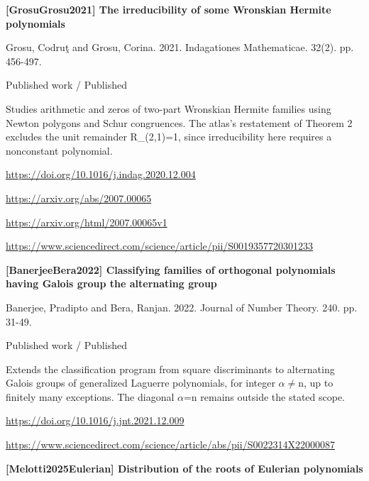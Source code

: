 \documentclass[11pt,a4paper,oneside,openany]{book}
\begin{document}
\vspace{9pt}
\hypertarget{ref:GrosuGrosu2021}{}
{\sffamily\bfseries\color{atlasgreen}[GrosuGrosu2021] The irreducibility of some Wronskian Hermite polynomials}\par
\color{black} Grosu, Codruţ and Grosu, Corina. 2021. Indagationes Mathematicae. 32(2). pp. 456-497.\par
{\small\sffamily\color{atlasgold}Published work / Published}\par
\color{black} Studies arithmetic and zeros of two-part Wronskian Hermite families using Newton polygons and Schur congruences. The atlas's restatement of Theorem 2 excludes the unit remainder R\_\allowbreak{}(2,1)=1, since irreducibility here requires a nonconstant polynomial.\par
{\footnotesize\url{https://doi.org/10.1016/j.indag.2020.12.004}}\par
{\footnotesize\url{https://arxiv.org/abs/2007.00065}}\par
{\footnotesize\url{https://arxiv.org/html/2007.00065v1}}\par
{\footnotesize\url{https://www.sciencedirect.com/science/article/pii/S0019357720301233}}\par
\vspace{9pt}
\hypertarget{ref:BanerjeeBera2022}{}
{\sffamily\bfseries\color{atlasgreen}[BanerjeeBera2022] Classifying families of orthogonal polynomials having Galois group the alternating group}\par
\color{black} Banerjee, Pradipto and Bera, Ranjan. 2022. Journal of Number Theory. 240. pp. 31-49.\par
{\small\sffamily\color{atlasgold}Published work / Published}\par
\color{black} Extends the classification program from square discriminants to alternating Galois groups of generalized Laguerre polynomials, for integer \ensuremath{\alpha}\ensuremath{\ne}n, up to finitely many exceptions. The diagonal \ensuremath{\alpha}=n remains outside the stated scope.\par
{\footnotesize\url{https://doi.org/10.1016/j.jnt.2021.12.009}}\par
{\footnotesize\url{https://www.sciencedirect.com/science/article/abs/pii/S0022314X22000087}}\par
\vspace{9pt}
\hypertarget{ref:Melotti2025Eulerian}{}
{\sffamily\bfseries\color{atlasgreen}[Melotti2025Eulerian] Distribution of the roots of Eulerian polynomials}\par
\end{document}
